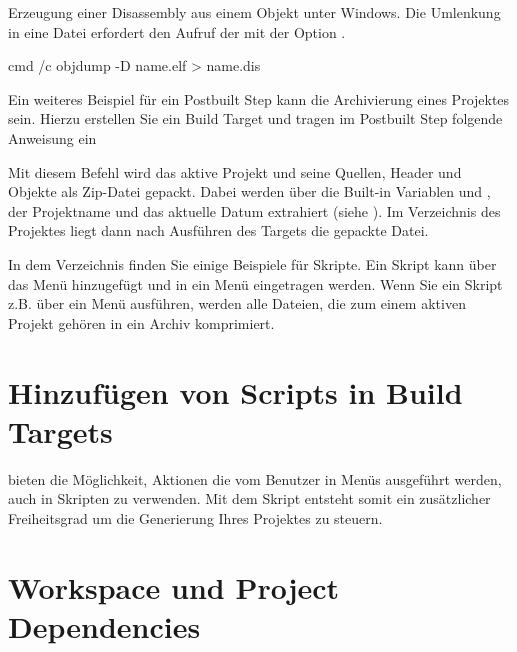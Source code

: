 
Erzeugung einer Disassembly aus einem Objekt unter Windows. Die Umlenkung in eine Datei erfordert den Aufruf der  mit der Option .

\begin{cmd}
cmd /c objdump -D name.elf > name.dis
\end{cmd}

Ein weiteres Beispiel für ein Postbuilt Step kann die Archivierung eines Projektes sein. Hierzu erstellen Sie ein Build Target  und tragen im Postbuilt Step folgende Anweisung ein


Mit diesem Befehl wird das aktive Projekt und seine Quellen, Header und Objekte als Zip-Datei gepackt. Dabei werden über die Built-in Variablen  und , der Projektname und das aktuelle Datum extrahiert (siehe ). Im Verzeichnis des Projektes liegt dann nach Ausführen des Targets  die gepackte Datei.

In dem Verzeichnis  finden Sie einige Beispiele für Skripte. Ein Skript kann über das Menü  hinzugefügt und in ein Menü eingetragen werden. Wenn Sie ein Skript z.B.  über ein Menü ausführen, werden alle Dateien, die zum einem aktiven Projekt gehören in ein Archiv  komprimiert.

\section{Hinzufügen von Scripts in Build Targets}

\codeblocks bieten die Möglichkeit, Aktionen die vom Benutzer in Menüs ausgeführt werden, auch in Skripten zu verwenden. Mit dem Skript entsteht somit ein zusätzlicher Freiheitsgrad um die Generierung Ihres Projektes zu steuern.


\section{Workspace und Project Dependencies}

